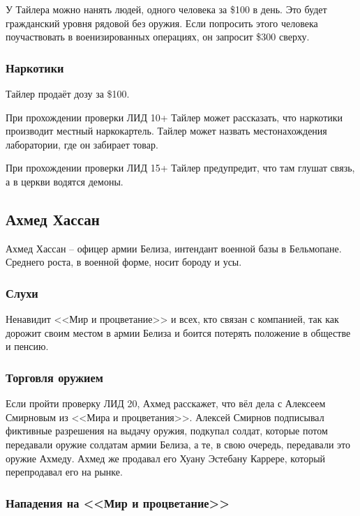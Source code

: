 \documentclass{article}
\begin{document}
У Тайлера можно нанять людей, одного человека за \$100 в день. Это будет
гражданский уровня рядовой без оружия. Если попросить этого человека
поучаствовать в военизированных операциях, он запросит \$300 сверху.

\subsubsection{Наркотики}\label{narcotics-tyler}

Тайлер продаёт дозу за \$100.

При прохождении проверки ЛИД 10+ Тайлер может рассказать, что наркотики
производит местный наркокартель. Тайлер может назвать местонахождения
лаборатории, где он забирает товар.

При прохождении проверки ЛИД 15+ Тайлер предупредит, что там глушат
связь, а в церкви водятся демоны.

\subsection{Ахмед
Хассан}\label{ahmed-hassan}

Ахмед Хассан -- офицер армии Белиза, интендант военной базы в
Бельмопане. Среднего роста, в военной форме, носит бороду и усы.

\subsubsection{Слухи}\label{rumors-hassan}

Ненавидит <<Мир и процветание>> и всех, кто связан с компанией, так как
дорожит своим местом в армии Белиза и боится потерять положение в
обществе и пенсию.

\subsubsection{Торговля
оружием}\label{arms-trading-hassan}

Если пройти проверку ЛИД 20, Ахмед расскажет, что вёл дела с Алексеем
Смирновым из <<Мира и процветания>>. Алексей Смирнов подписывал фиктивные
разрешения на выдачу оружия, подкупал солдат, которые потом передавали
оружие солдатам армии Белиза, а те, в свою очередь, передавали это
оружие Ахмеду. Ахмед же продавал его Хуану Эстебану Каррере, который
перепродавал его на рынке.

\subsubsection{Нападения на <<Мир и
процветание>>}\label{pap-attacks-hassan}
\end{document}
